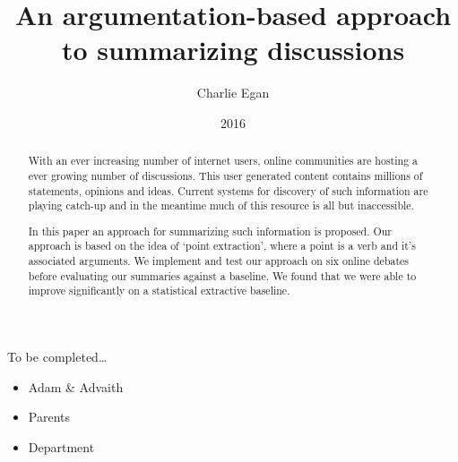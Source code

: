 \documentclass[BSc]{abdnthesis}
\title{An argumentation-based approach to summarizing discussions}
\author{Charlie Egan}
\date{2016}
\begin{document}

\maketitle
\makedeclaration


\begin{abstract}
  With an ever increasing number of internet users, online communities are hosting a ever growing number of discussions. This user generated content contains millions of statements, opinions and ideas. Current systems for discovery of such information are playing catch-up and in the meantime much of this resource is all but inaccessible.

  In this paper an approach for summarizing such information is proposed. Our approach is based on the idea of `point extraction', where a point is a verb and it's associated arguments. We implement and test our approach on six online debates before evaluating our summaries against a baseline. We found that we were able to improve significantly on a statistical extractive baseline.
\end{abstract}

\begin{acknowledgements}
  To be completed\dots
  \begin{itemize}
    \item{Adam \& Advaith}
    \item{Parents}
    \item{Department}
  \end{itemize}
\end{acknowledgements}


\tableofcontents












\appendix




\end{document}

